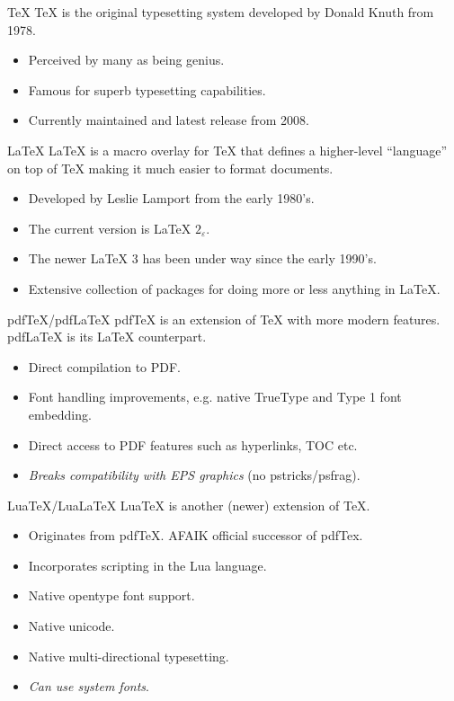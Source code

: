 \documentclass[english]{beamer}
\begin{document}
\begin{frame}{\insertsection}{\TeX}
  \TeX{} is the original typesetting system developed by Donald Knuth
  from 1978.
  \begin{itemize}
  \item Perceived by many as being genius.
  \item Famous for superb typesetting capabilities.
  \item Currently maintained and latest release from 2008.
  \end{itemize}
\end{frame}

\begin{frame}{\insertsection}{\LaTeX}
  \LaTeX{} is a macro overlay for \TeX{} that defines a higher-level
  ``language'' on top of \TeX{} making it much easier to format
  documents.
  \begin{itemize}
  \item Developed by Leslie Lamport from the early 1980's.
  \item The current version is \LaTeX{} $2_\varepsilon$.
  \item The newer \LaTeX{} 3 has been under way since the early 1990's.
  \item Extensive collection of packages for doing more or less
    anything in \LaTeX.
  \end{itemize}
\end{frame}

\begin{frame}{\insertsection}{pdfTeX/pdfLaTeX}
  pdfTeX is an extension of \TeX{} with more modern features. pdfLaTeX
  is its \LaTeX{} counterpart.
  \begin{itemize}
  \item Direct compilation to PDF.
  \item Font handling improvements, e.g. native TrueType and Type 1
    font embedding.
  \item Direct access to PDF features such as hyperlinks, TOC etc.
  \item \emph{Breaks compatibility with EPS graphics} (no
    pstricks/psfrag).
  \end{itemize}
\end{frame}

\begin{frame}{\insertsection}{LuaTeX/LuaLaTeX}
  LuaTeX is another (newer) extension of \TeX.
  \begin{itemize}
  \item Originates from pdfTeX. AFAIK official successor of pdfTex.
  \item Incorporates scripting in the Lua language.
  \item Native opentype font support.
  \item Native unicode.
  \item Native multi-directional typesetting.
  \item \emph{Can use system fonts}.
  \end{itemize}
\end{frame}
\end{document}
